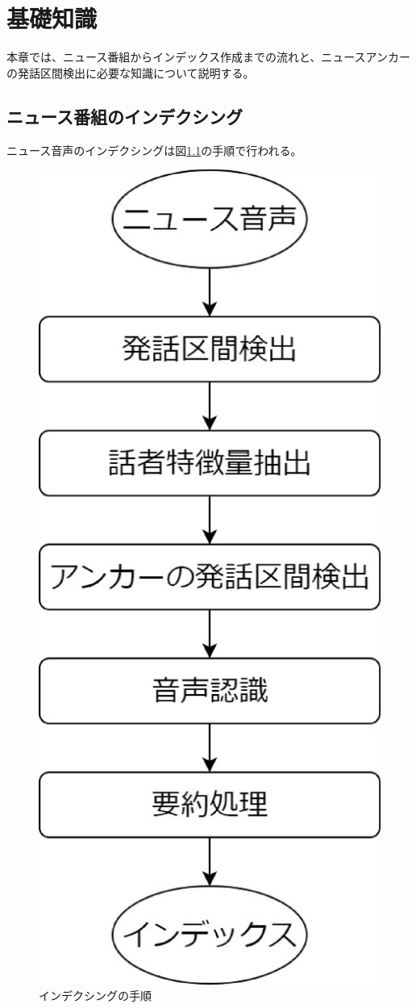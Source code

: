 \chapter{基礎知識}
本章では、ニュース番組からインデックス作成までの流れと、ニュースアンカーの発話区間検出に必要な知識について説明する。
\section{ニュース番組のインデクシング\cite{indexing_flow}}
ニュース音声のインデクシングは図\ref{fig:indexing}の手順で行われる。

\begin{figure}[H]
  \begin{center}
    \includegraphics[scale=0.3]{./figure/indexing.eps}
  \end{center}
  \caption{インデクシングの手順 \label{fig:indexing}}
\end{figure}

